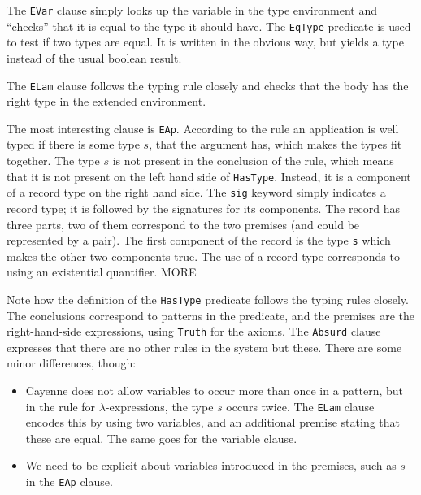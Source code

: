 \documentclass{llncs}[12pt]             %
\newcommand\tmp[1]{{\sf #1}}
\newcommand{\te}[1]{{\tt #1}}
\begin{document}
The \te{EVar} clause simply looks up the variable in the type environment
and ``checks'' that it is equal to the type it should have.  The \te{EqType}
predicate is used to test if two types are equal.  It is written in the
obvious way, but yields a type instead of the usual boolean result.

The \te{ELam} clause follows the typing rule closely and checks that the
body has the right type in the extended environment.

The most interesting clause is \te{EAp}.  According to the rule an application
is well typed if there is some type $s$, that the argument has, which makes
the types fit together.  The type $s$ is not present in the conclusion of the
rule, which means that it is not present on the left hand side of \te{HasType}.
Instead, it is a component of a record type on the right hand side.
The \te{sig} keyword simply indicates a record type; it is followed by
the signatures for its components.
The record
has three parts, two of them correspond to the two premises (and could be represented
by a pair).  The first component of the record is the type \te{s} which makes the
other two components true.  The use of a record type corresponds to using
an existential quantifier. \tmp{MORE}

Note how the definition of the \te{HasType} predicate follows the typing rules
closely. The conclusions correspond to patterns in the predicate, and
the premises are the right-hand-side expressions, using \te{Truth} for the
axioms. The \te{Absurd} clause expresses that there are no other rules in
the system but these. There are some minor differences, though:

\begin{itemize}

\item Cayenne does not allow variables to occur more than once in a
  pattern, but in the rule for $\lambda$-expressions, the type $s$
  occurs twice. The \te{ELam} clause encodes this by using two
  variables, and an additional premise stating that these are
  equal. The same goes for the variable clause.

\item We need to be explicit about variables introduced in the
  premises, such as $s$ in the \te{EAp} clause.

\end{itemize}
\end{document}
